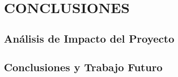  \setcounter{subsection}{0}

\section{CONCLUSIONES}

\subsection{Análisis de Impacto del Proyecto}



\subsection{Conclusiones y Trabajo Futuro}

